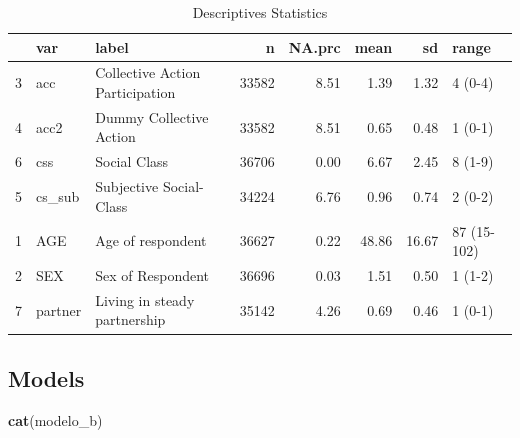 \documentclass[12pt]{article}
\newenvironment{Shaded}{\begin{snugshade}}{\end{snugshade}}
\newcommand{\FunctionTok}[1]{\textcolor[rgb]{0.13,0.29,0.53}{\textbf{#1}}}
\newcommand{\NormalTok}[1]{#1}
\begin{document}
\begin{table}[ht]
\centering
\caption{Descriptives Statistics}
\begin{tabular}{rllrrrrl}
  \hline
 & var & label & n & NA.prc & mean & sd & range \\ 
  \hline
3 & acc & Collective Action Participation & 33582 & 8.51 & 1.39 & 1.32 & 4 (0-4) \\ 
  4 & acc2 & Dummy Collective Action & 33582 & 8.51 & 0.65 & 0.48 & 1 (0-1) \\ 
  6 & css & Social Class & 36706 & 0.00 & 6.67 & 2.45 & 8 (1-9) \\ 
  5 & cs\_sub & Subjective Social-Class & 34224 & 6.76 & 0.96 & 0.74 & 2 (0-2) \\ 
  1 & AGE & Age of respondent & 36627 & 0.22 & 48.86 & 16.67 & 87 (15-102) \\ 
  2 & SEX & Sex of Respondent & 36696 & 0.03 & 1.51 & 0.50 & 1 (1-2) \\ 
  7 & partner & Living in steady partnership & 35142 & 4.26 & 0.69 & 0.46 & 1 (0-1) \\ 
   \hline
\end{tabular}
\end{table}

\hypertarget{models}{%
\subsection{Models}\label{models}}

\begin{Shaded}
\begin{Highlighting}[]
\FunctionTok{cat}\NormalTok{(modelo\_b)}
\end{Highlighting}
\end{Shaded}
\end{document}
